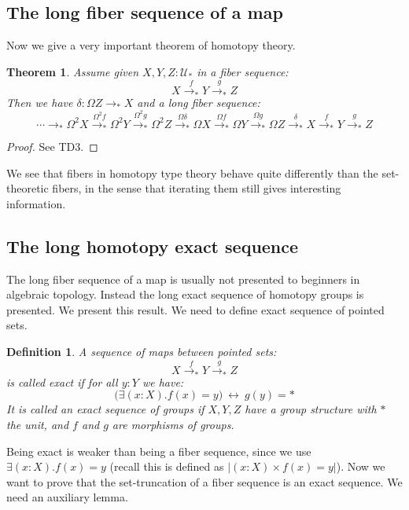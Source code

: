 \documentclass{article}
\newcommand{\sse}[1]{\medbreak \subsection{#1}}
\newcommand{\U}{{\mathcal U}}
\renewcommand{\r}{\rightarrow}
\newtheorem{definition}{Definition}
\newtheorem{theorem}{Theorem}
\begin{document}
\sse{The long fiber sequence of a map}

Now we give a very important theorem of homotopy theory.

\begin{theorem}
Assume given $X,Y,Z:\U_*$ in a fiber sequence:
\[X \overset{f}{\r_*} Y\overset{g}{\r_*} Z\] 
Then we have $\delta : \Omega Z\r_* X$ and a long fiber sequence:
\[\cdots \r_* \Omega^2 X \overset{\Omega^2 f}{\r_*} \Omega^2 Y \overset{\Omega^2 g}{\r_*}\Omega^2 Z \overset{\Omega\delta}{\r_*} \Omega X \overset{\Omega f}{\r_*} \Omega Y \overset{\Omega g}{\r_*} \Omega Z \overset{\delta}{\r_*} X \overset{f}{\r_*} Y\overset{g}{\r_*} Z  \]
\end{theorem}
\begin{proof}
See TD3.
\end{proof}

We see that fibers in homotopy type theory behave quite differently than the set-theoretic fibers, in the sense that iterating them still gives interesting information.






\sse{The long homotopy exact sequence}

The long fiber sequence of a map is usually not presented to beginners in algebraic topology. Instead the long exact sequence of homotopy groups is presented. We present this result. We need to define exact sequence of pointed sets.

\begin{definition}
A sequence of maps between pointed sets:
\[X \overset{f}{\r_*} Y\overset{g}{\r_*} Z\] 
is called exact if for all $y:Y$ we have:
\[\big(\exists(x:X).f(x)=y\big) \ \leftrightarrow\ g(y)=*\]
It is called an exact sequence of groups if $X,Y,Z$ have a group structure with $*$ the unit, and $f$ and $g$ are morphisms of groups.
\end{definition}

Being exact is weaker than being a fiber sequence, since we use $\exists(x:X).f(x)=y$ (recall this is defined as $|(x:X)\times f(x)=y|$). Now we want to prove that the set-truncation of a fiber sequence is an exact sequence. We need an auxiliary lemma.
\end{document}
